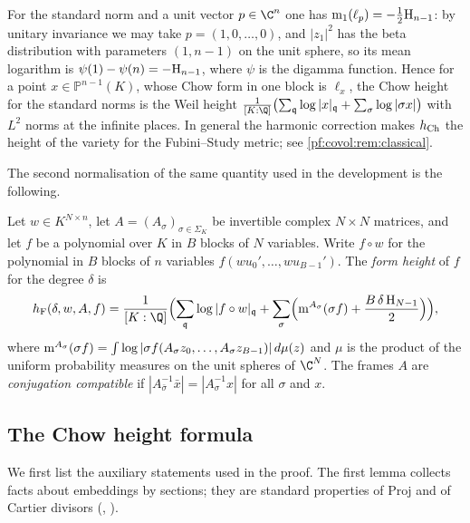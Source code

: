 For the standard norm and a unit vector $p\in\C^n$ one has $\operatorname{m}_1(\ell_p)=-\frac12\mathrm{H}_{n-1}$:
by unitary invariance we may take $p=(1,0,\dots,0)$, and $|z_1|^2$ has the beta distribution with
parameters $(1,n-1)$ on the unit sphere, so its mean logarithm is $\psi(1)-\psi(n)=-\mathrm{H}_{n-1}$, where
$\psi$ is the digamma function. Hence for a point $x\in\mathbb P^{n-1}(K)$, whose Chow form in one block is
$\ell_x$, the Chow height for the standard norms is the Weil height
$\frac1{[K:\Q]}\bigl(\sum_{\mathfrak q}\log|x|_{\mathfrak q}+\sum_\sigma\log|\sigma x|\bigr)$ with $L^2$ norms
at the infinite places. In general the harmonic correction makes $h_{\mathrm{Ch}}$ the height of the variety for
the Fubini--Study metric; see \cref{pf:covol:rem:classical}.

The second normalisation of the same quantity used in the development is the following.

\begin{definition}\label{pf:covol:def:formht}
Let $w\in K^{N\times n}$, let $A=(A_\sigma)_{\sigma\in\Sigma_K}$ be invertible complex $N\times N$
matrices, and let $f$ be a polynomial over $K$ in $B$ blocks of $N$ variables. Write
$f\circ w$ for the polynomial in $B$ blocks of $n$ variables $f(wu_0',\dots,wu_{B-1}')$. The
\emph{form height} of $f$ for the degree $\delta$ is
\[
\covolHform(\delta,w,A,f)=\frac1{[K:\Q]}\Bigl(\sum_{\mathfrak q}\log|f\circ w|_{\mathfrak q}+
\sum_{\sigma}\Bigl(\covolMah^{A_\sigma}(\sigma f)+\frac{B\,\delta\,\covolHar_{N-1}}2\Bigr)\Bigr),
\]
where $\operatorname{m}^{A_\sigma}(\sigma f)=\int\log|\sigma f(A_\sigma z_0,\dots,A_\sigma z_{B-1})|\,d\mu(z)$ and
$\mu$ is the product of the uniform probability measures on the unit spheres of $\C^N$. The frames
$A$ are \emph{conjugation compatible} if $|A_{\bar\sigma}^{-1}\bar x|=|A_\sigma^{-1}x|$ for all
$\sigma$ and $x$.
\end{definition}

\subsection{The Chow height formula}\label{sec:pf:covol:chowht}

We first list the auxiliary statements used in the proof. The first lemma collects facts about
embeddings by sections; they are standard properties of $\mathrm{Proj}$ and of Cartier divisors
(\cite[Ch.~II]{Hartshorne1977}, \cite[Ch.~1--2]{Fulton1998}).

